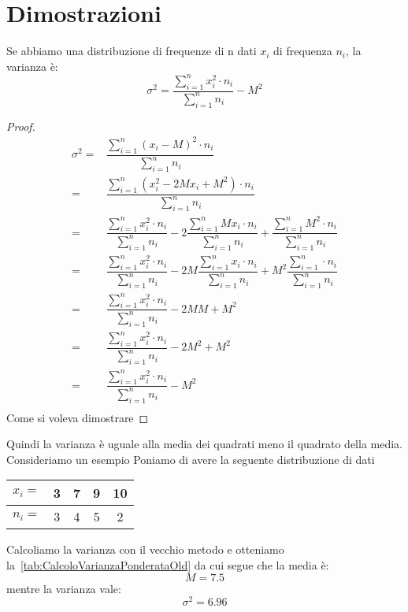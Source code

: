 \chapter{Dimostrazioni}
\begin{thm}[Varianza]
	Se abbiamo una distribuzione di frequenze di n dati  $x_{i}$ di frequenza $n_{i}$, la varianza è: \[\sigma^{2}=\dfrac{\sum_{i=1}^{n}x_{i}^{2}\cdot n_{i}}{\sum_{i=1}^{n} n_{i}}-M^2\] 
\end{thm}
\begin{proof}
\begin{align*}
\sigma^{2}=&\dfrac{\sum_{i=1}^{n}(x_{i}-M)^{2}\cdot n_{i}}{\sum_{i=1}^{n} n_{i}}\\
=&\dfrac{\sum_{i=1}^{n}(x_{i}^{2} -2Mx_{i}+M^{2})\cdot n_{i}}{\sum_{i=1}^{n} n_{i}}\\
=&\dfrac{\sum_{i=1}^{n}x_{i}^{2}\cdot n_{i}}{\sum_{i=1}^{n} n_{i}}-2 \dfrac{\sum_{i=1}^{n}Mx_{i}\cdot n_{i}}{\sum_{i=1}^{n} n_{i}} +\dfrac{\sum_{i=1}^{n}M^{2}\cdot n_{i}}{\sum_{i=1}^{n} n_{i}}\\
=&\dfrac{\sum_{i=1}^{n}x_{i}^{2}\cdot n_{i}}{\sum_{i=1}^{n} n_{i}}-2M \dfrac{\sum_{i=1}^{n}x_{i}\cdot n_{i}}{\sum_{i=1}^{n} n_{i}} +M^{2}\dfrac{\sum_{i=1}^{n}\cdot n_{i}}{\sum_{i=1}^{n} n_{i}}\\
=&\dfrac{\sum_{i=1}^{n}x_{i}^{2}\cdot n_{i}}{\sum_{i=1}^{n} n_{i}}-2MM +M^{2}\\
=&\dfrac{\sum_{i=1}^{n}x_{i}^{2}\cdot n_{i}}{\sum_{i=1}^{n} n_{i}}-2M^{2} +M^{2}\\
=&\dfrac{\sum_{i=1}^{n}x_{i}^{2}\cdot n_{i}}{\sum_{i=1}^{n} n_{i}}-M^{2}\\
\end{align*}
Come si voleva dimostrare
\end{proof}
Quindi la varianza è uguale alla media dei quadrati meno il quadrato della media.
Consideriamo un esempio 
Poniamo di avere la seguente distribuzione di dati
\begin{center}
	\begin{tabular}{l*{4} {S[table-format=1.0]}}
		{$x_{i}=$}	&3  &7  &9  &10   \\
		\midrule 
		{$n_{i}=$}	&3 &4  &5 & 2 \\   
	\end{tabular}
\end{center}
Calcoliamo la varianza con il vecchio metodo e otteniamo la~\vref{tab:CalcoloVarianzaPonderataOld} da cui segue che la media è: \[M=\num{7.5}\] mentre la varianza vale:
\[\sigma^2=\num{6.96}\]
